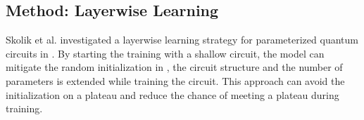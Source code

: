 \subsection{Method: Layerwise Learning}


Skolik et al. investigated a layerwise learning strategy for parameterized quantum circuits in \cite{skolikLayerwiseLearningQuantum2021}. 
By starting the training with a shallow circuit, the model can mitigate the random initialization in \cite{mccleanBarrenPlateausQuantum2018}, the circuit structure and the number of parameters is extended while training the circuit. This approach can avoid the initialization on a plateau and reduce the chance of meeting a plateau during training.